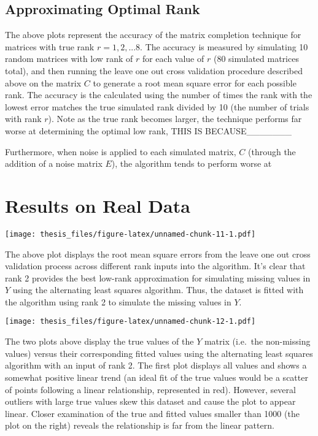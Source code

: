 \documentclass[12pt,twoside]{dukestatscithesis}
\theoremstyle{definition}
\theoremstyle{definition}
\theoremstyle{definition}
\theoremstyle{remark}
\begin{document}
\subsection{Approximating Optimal
Rank}\label{approximating-optimal-rank}

The above plots represent the accuracy of the matrix completion
technique for matrices with true rank \(r = 1,2,...8\). The accuracy is
measured by simulating 10 random matrices with low rank of \(r\) for
each value of \(r\) (80 simulated matrices total), and then running the
leave one out cross validation procedure described above on the matrix
\(C\) to generate a root mean square error for each possible rank. The
accuracy is the calculated using the number of times the rank with the
lowest error matches the true simulated rank divided by 10 (the number
of trials with rank \(r\)). Note as the true rank becomes larger, the
technique performs far worse at determining the optimal low rank, THIS
IS BECAUSE\_\_\_\_\_\_\_

Furthermore, when noise is applied to each simulated matrix, \(C\)
(through the addition of a noise matrix \(E\)), the algorithm tends to
perform worse at

\section{Results on Real Data}\label{results-on-real-data}

\texttt{[image: thesis\_files/figure-latex/unnamed-chunk-11-1.pdf]}

The above plot displays the root mean square errors from the leave one
out cross validation process across different rank inputs into the
algorithm. It's clear that rank 2 provides the best low-rank
approximation for simulating missing values in \(Y\) using the
alternating least squares algorithm. Thus, the dataset is fitted with
the algorithm using rank 2 to simulate the missing values in \(Y\).

\texttt{[image: thesis\_files/figure-latex/unnamed-chunk-12-1.pdf]}

The two plots above display the true values of the \(Y\) matrix
(i.e.~the non-missing values) versus their corresponding fitted values
using the alternating least squares algorithm with an input of rank 2.
The first plot displays all values and shows a somewhat positive linear
trend (an ideal fit of the true values would be a scatter of points
following a linear relationship, represented in red). However, several
outliers with large true values skew this dataset and cause the plot to
appear linear. Closer examination of the true and fitted values smaller
than 1000 (the plot on the right) reveals the relationship is far from
the linear pattern.
\end{document}
